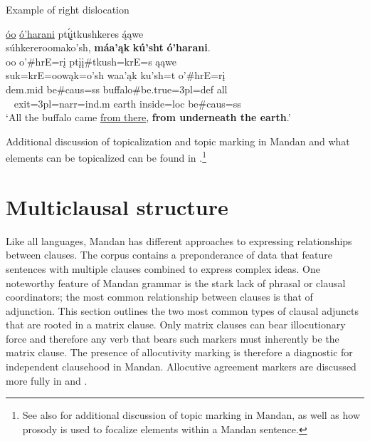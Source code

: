 \newpage


\begin{exe}
    \item\label{SkExRightDislocation} Example of right dislocation

            \glll \uline{óo} \uline{ó'harani} pt\'{ı̨}įtkushkeres ą́ąwe ~ ~ ~ ~ ~ ~ ~ ~ ~ ~ ~ ~ ~ ~ ~ ~ ~ súhkereroomako'sh, \textbf{máa'ąk} \textbf{kú'sht} \textbf{ó'harani}.\\
        oo o'\#hrE=rį ptįį\#tkush=krE=s ąąwe ~ ~ ~ ~ ~ ~ ~ ~ ~ ~ ~ ~ ~ ~ ~ ~ ~  suk=krE=oowąk=o'sh waa'ąk ku'sh=t o'\#hrE=rį\\
        dem.mid \textnormal{be}\#caus=ss \textnormal{buffalo}\#\textnormal{be.true}=3pl=def \textnormal{all} ~ ~ ~ ~ ~ ~ ~ ~ ~ ~ ~ ~ ~ ~ ~ ~ ~ \textnormal{exit}=3pl=narr=ind.m \textnormal{earth} \textnormal{inside}=loc \textnormal{be}\#caus=ss\\
        \glt `All the buffalo came \uline{from there}, \textbf{from underneath the earth}.' \citep[114]{hollow1973b}
\end{exe}

Additional discussion of topicalization and topic marking in Mandan and what elements can be topicalized can be found in .\footnote{See also \citet{kasak2022} for additional discussion of topic marking in Mandan, as well as how prosody is used to focalize elements within a Mandan sentence.}

\section{Multiclausal structure}\label{CHSk8}

Like all languages, Mandan has different approaches to expressing relationships between clauses. The corpus contains a preponderance of data that feature sentences with multiple clauses combined to express complex ideas. One noteworthy feature of Mandan grammar is the stark lack of phrasal or clausal coordinators; the most common relationship between clauses is that of adjunction. This section outlines the two most common types of clausal adjuncts that are rooted in a matrix clause. Only matrix clauses can bear illocutionary force and therefore any verb that bears such markers must inherently be the matrix clause. The presence of allocutivity marking is therefore a diagnostic for independent clausehood in Mandan. Allocutive agreement markers are discussed more fully in  and .

